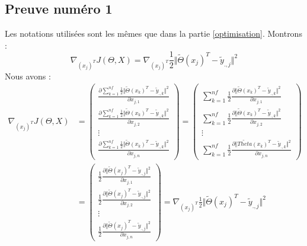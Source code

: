 \documentclass[a4paper,10pt]{article}
\begin{document}
\subsection{Preuve numéro 1}  
\label{P1}
Les notations utilisées sont les mêmes que dans la partie \ref{optimisation}. Montrons : \[\nabla_{(x_{j})^T} J(\Theta, X) = \nabla_{(x_{j})^T}\frac{1}{2}\Vert\tilde{\Theta}(x_{j})^{T}-\tilde{y}_{.,j}\Vert^{2}\]
Nous avons :
\begin{align*}
\nabla_{(x_{j})^T} J(\Theta, X) &=  
\begin{pmatrix}  
\displaystyle\frac{\partial \displaystyle\sum_{k=1}^{nf}\frac{1}{2}\Vert\tilde{\Theta}(x_{k})^{T}-\tilde{y}_{.,k}\Vert^{2}}{\partial x_{j,1}}\\  
\displaystyle\frac{\partial \displaystyle\sum_{k=1}^{nf}\frac{1}{2}\Vert\tilde{\Theta}(x_{k})^{T}-\tilde{y}_{.,k}\Vert^{2}}{\partial x_{j,2}}\\  
\vdots\\  
\displaystyle\frac{\partial \displaystyle\sum_{k=1}^{nf}\frac{1}{2}\Vert\tilde{\Theta}(x_{k})^{T}-\tilde{y}_{.,k}\Vert^{2}}{\partial x_{j,n}}  
\end{pmatrix}  
=  
\begin{pmatrix}  
\displaystyle\sum_{k=1}^{nf}  
\frac{1}{2}\frac{\partial\Vert\tilde{\Theta}(x_{k})^{T}-\tilde{y}_{.,k}\Vert^{2}}{\partial x_{j,1}}\\  
\displaystyle\sum_{k=1}^{nf}  
\frac{1}{2}\frac{\partial\Vert\tilde{\Theta}(x_{k})^{T}-\tilde{y}_{.,k}\Vert^{2}}{\partial x_{j,2}}\\  
\vdots\\  
\displaystyle\sum_{k=1}^{nf}  
\frac{1}{2}\frac{\partial\Vert\tilde{Theta}(x_{k})^{T}-\tilde{y}_{.,k}\Vert^{2}}{\partial x_{j,n}}  
\end{pmatrix}\\
&=  
\begin{pmatrix}  
\displaystyle  
\frac{1}{2}\frac{\partial\Vert\tilde{\Theta}(x_{j})^{T}-\tilde{y}_{.,j}\Vert^{2}}{\partial x_{j,1}}\\  
\displaystyle  
\frac{1}{2}\frac{\partial\Vert\tilde{\Theta}(x_{j})^{T}-\tilde{y}_{.,j}\Vert^{2}}{\partial x_{j,2}}\\  
\vdots\\  
\displaystyle  
\frac{1}{2}\frac{\partial\Vert\tilde{\Theta}(x_{j})^{T}-\tilde{y}_{.,j}\Vert^{2}}{\partial x_{j,n}}  
\end{pmatrix}
=  
\displaystyle  
\nabla_{(x_{j})^T}\frac{1}{2}\Vert\tilde{\Theta}(x_{j})^{T}-\tilde{y}_{.,j}\Vert^{2}
\end{align*}\\
\end{document}
